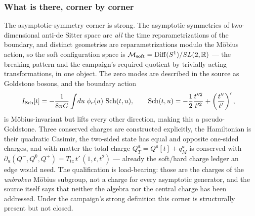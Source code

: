 \subsubsection*{What is there, corner by corner}

The asymptotic-symmetry corner is strong. The asymptotic symmetries of
two-dimensional anti-de Sitter space are \emph{all} the time reparametrizations
of the boundary, and distinct geometries are reparametrizations modulo the
M\"obius action, so the soft configuration space is
$\mathcal{M}_{\mathrm{soft}}=\operatorname{Diff}(S^1)/SL(2,\mathbb{R})$ --- the breaking pattern and
the campaign's required quotient by trivially-acting transformations, in one
object. The zero modes are described in the source as Goldstone bosons, and the
boundary action
\begin{equation}
  I_{\mathrm{Sch}}[t]=-\frac{1}{8\pi G}\int\!du\;\phi_r(u)\,\operatorname{Sch}(t,u),
  \qquad
  \operatorname{Sch}(t,u)=-\frac12\frac{t''^2}{t'^2}+\left(\frac{t''}{t'}\right)',
  \label{eq:op-schwarzian-action}
\end{equation}
is M\"obius-invariant but lifts every other direction, making this a
pseudo-Goldstone. Three conserved charges are constructed explicitly, the
Hamiltonian is their quadratic Casimir, the two-sided state has equal and
opposite one-sided charges, and with matter the total charge
$Q^a_T=Q^a[t]+q^a_M$ is conserved with
$\partial_u(Q^-,Q^0,Q^+)=T_{tz}\,t'\,(1,t,t^2)$ --- already the soft/hard
charge ledger an edge would need. The qualification is load-bearing: those are
the charges of the \emph{unbroken} M\"obius subgroup, not a charge for every
asymptotic generator, and the source itself says that neither the algebra nor
the central charge has been addressed. Under the campaign's strong definition
this corner is structurally present but not closed.

